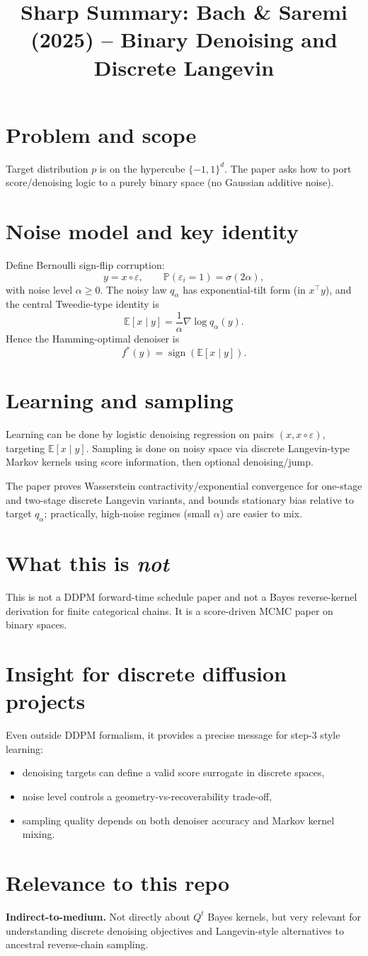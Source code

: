 \documentclass[11pt]{article}
\title{Sharp Summary: Bach \& Saremi (2025) -- Binary Denoising and Discrete Langevin}
\author{}
\date{}
\begin{document}
\maketitle

\section*{Problem and scope}
Target distribution $p$ is on the hypercube $\{-1,1\}^d$. The paper asks how to port score/denoising logic to a purely binary space (no Gaussian additive noise).

\section*{Noise model and key identity}
Define Bernoulli sign-flip corruption:
\[
y = x\circ \varepsilon,
\qquad
\mathbb P(\varepsilon_i=1)=\sigma(2\alpha),
\]
with noise level $\alpha\ge 0$.
The noisy law $q_\alpha$ has exponential-tilt form (in $x^\top y$), and the central Tweedie-type identity is
\[
\mathbb E[x\mid y]=\frac{1}{\alpha}\nabla \log q_\alpha(y).
\]
Hence the Hamming-optimal denoiser is
\[
f^*(y)=\operatorname{sign}(\mathbb E[x\mid y]).
\]

\section*{Learning and sampling}
Learning can be done by logistic denoising regression on pairs $(x, x\circ\varepsilon)$, targeting $\mathbb E[x\mid y]$.
Sampling is done on noisy space via discrete Langevin-type Markov kernels using score information, then optional denoising/jump.

The paper proves Wasserstein contractivity/exponential convergence for one-stage and two-stage discrete Langevin variants, and bounds stationary bias relative to target $q_\alpha$; practically, high-noise regimes (small $\alpha$) are easier to mix.

\section*{What this is \emph{not}}
This is not a DDPM forward-time schedule paper and not a Bayes reverse-kernel derivation for finite categorical chains. It is a score-driven MCMC paper on binary spaces.

\section*{Insight for discrete diffusion projects}
Even outside DDPM formalism, it provides a precise message for step-3 style learning:
\begin{itemize}
\item denoising targets can define a valid score surrogate in discrete spaces,
\item noise level controls a geometry-vs-recoverability trade-off,
\item sampling quality depends on both denoiser accuracy and Markov kernel mixing.
\end{itemize}

\section*{Relevance to this repo}
\textbf{Indirect-to-medium.}
Not directly about $Q^t$ Bayes kernels, but very relevant for understanding discrete denoising objectives and Langevin-style alternatives to ancestral reverse-chain sampling.
\end{document}
